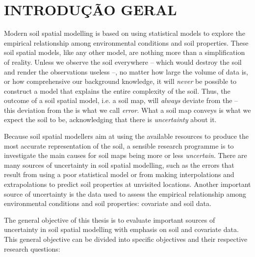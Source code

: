 \artigofalse
\chapter{INTRODUÇÃO GERAL}
\label{appen:introduction-pt}

Modern soil spatial modelling is based on using statistical models to explore the empirical relationship among 
environmental conditions and soil properties. These soil spatial models, like any other model, are nothing 
more than a simplification of reality. Unless we observe the soil everywhere -- which would destroy the 
soil and render the observations useless --, no matter how large the volume of data is, or how comprehensive 
our background knowledge, it will \emph{never} be possible to construct a model that explains the entire 
complexity of the soil. Thus, the outcome of a soil spatial model, i.e. a soil map, will \emph{always} deviate 
from the  -- this deviation from the  is what we call \emph{error}. What a soil map conveys 
is what we expect the soil to be, acknowledging that there is \emph{uncertainty} about it.

Because soil spatial modellers aim at using the available resources to produce the most accurate 
representation of the soil, a sensible research programme is to investigate the main causes for soil maps 
being more or less \emph{uncertain}. There are many sources of uncertainty in soil spatial modelling, such as 
the errors that result from using a poor statistical model or from making interpolations and extrapolations 
to predict soil properties at unvisited locations. Another important source of uncertainty is the data used to 
assess the empirical relationship among environmental conditions and soil properties: covariate and soil data.

The general objective of this thesis is to evaluate important sources of uncertainty in soil spatial modelling 
with emphasis on soil and covariate data. This general objective can be divided into specific objectives and 
their respective research questions:

